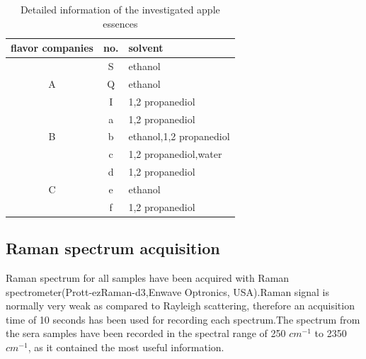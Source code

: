 \documentclass[a4paper]{article}
\begin{document}
\begin{table}[h] %
  \centering
  \caption{Detailed information of the investigated apple essences}\label{a}
  \begin{tabular}{c|c|l}

     \hline
     flavor companies       & no.       & solvent \\
     \hline
     \multirow{3}{*}{A}       & S         & ethanol \\
     \cline{2-3}
                              & Q         & ethanol \\
     \cline{2-3}
                              & I         & 1,2 propanediol \\
     \hline
     \multirow{3}{*}{B}       & a         & 1,2 propanediol \\
     \cline{2-3}
                              & b         & ethanol,1,2 propanediol \\
     \cline{2-3}
                              & c         & 1,2 propanediol,water \\
     \hline
     \multirow{3}{*}{C}       & d         & 1,2 propanediol \\
     \cline{2-3}
                              & e         & ethanol \\
     \cline{2-3}
                              & f         & 1,2 propanediol \\
     \hline
   \end{tabular}

\end{table}



\subsection{Raman spectrum acquisition}%
Raman spectrum for all samples have been acquired with Raman spectrometer(Prott-ezRaman-d3,Enwave Optronics, USA).Raman  signal  is  normally  very  weak  as  compared  to  Rayleigh  scattering,  therefore  an acquisition time of 10 seconds has been used for recording each spectrum.The spectrum from the  sera  samples  have  been  recorded  in  the  spectral  range  of  250 $cm^{−1}$  to  2350 $cm^{−1}$,  as  it contained the most useful information.
\end{document}
